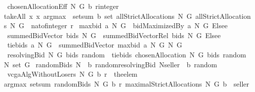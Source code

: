 \begin{isabellebody}
\isanewline
{}\isamarkupfalse%
\ {\isachardoublequoteopen}chosenAllocationEff\ N\ G\ b\ {\isacharparenleft}r{\isacharcolon}{\isacharcolon}integer{\isacharparenright}\ {\isacharequal}{\isacharequal}\ \isanewline
{\isacharparenleft}takeAll\ {\isacharparenleft}{\isacharpercent}x{\isachardot}\ x{\isasymin}\ {\isacharparenleft}argmax\ {\isasymcirc}\ setsum{\isacharparenright}\ b\ {\isacharparenleft}set\ {\isacharparenleft}allStrictAllocations\ N\ G{\isacharparenright}{\isacharparenright}{\isacharparenright}\ {\isacharparenleft}allStrictAllocations\ N\ G{\isacharparenright}\ {\isacharbang}\ {\isacharparenleft}nat{\isacharunderscore}of{\isacharunderscore}integer\ r{\isacharparenright}{\isacharparenright}{\isachardoublequoteclose}\isanewline
\isanewline
\isanewline
{}\isamarkupfalse%
\ {\isachardoublequoteopen}maxbid\ a\ N\ G\ {\isacharequal}{\isacharequal}\ {\isacharparenleft}bidMaximizedBy\ a\ N\ G{\isacharparenright}\ Elsee\ {}{\isachardoublequoteclose}\isanewline
{}\isamarkupfalse%
\ {\isachardoublequoteopen}summedBidVector\ bids\ N\ G\ {\isacharequal}{\isacharequal}\ {\isacharparenleft}summedBidVectorRel\ bids\ N\ G{\isacharparenright}\ Elsee\ {}{\isachardoublequoteclose}\isanewline
{}\isamarkupfalse%
\ {\isachardoublequoteopen}tiebids\ a\ N\ G\ {\isacharequal}{\isacharequal}\ summedBidVector\ {\isacharparenleft}maxbid\ a\ N\ G{\isacharparenright}\ N\ G{\isachardoublequoteclose}\isanewline
{}\isamarkupfalse%
\ {\isachardoublequoteopen}resolvingBid\ N\ G\ bids\ random\ {\isacharequal}{\isacharequal}\ tiebids\ {\isacharparenleft}chosenAllocation\ N\ G\ bids\ random{\isacharparenright}\ N\ {\isacharparenleft}set\ G{\isacharparenright}{\isachardoublequoteclose}\isanewline
{}\isamarkupfalse%
\ {\isachardoublequoteopen}randomBids\ N\ {\isasymOmega}\ b\ random{\isacharequal}{\isacharequal}resolvingBid\ {\isacharparenleft}N{\isasymunion}{\isacharbraceleft}seller{\isacharbraceright}{\isacharparenright}\ {\isasymOmega}\ b\ random{\isachardoublequoteclose}\isanewline
{}\isamarkupfalse%
\ {\isachardoublequoteopen}vcgaAlgWithoutLosers\ N\ G\ b\ r\ {\isacharequal}{\isacharequal}\ {\isacharparenleft}the{\isacharunderscore}elem\isanewline
{\isacharparenleft}argmax\ {\isacharparenleft}setsum\ {\isacharparenleft}randomBids\ N\ G\ b\ r{\isacharparenright}{\isacharparenright}\ {\isacharparenleft}maximalStrictAllocations\ N\ G\ b{\isacharparenright}{\isacharparenright}{\isacharparenright}\ {\isacharminus}{\isacharminus}\ seller{\isachardoublequoteclose}\isanewline

\end{isabellebody}
